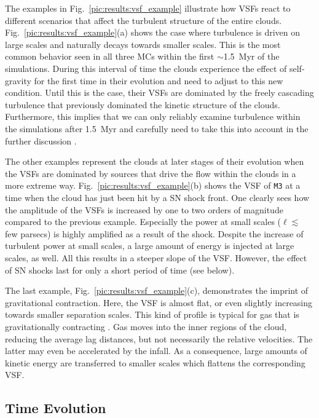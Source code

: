 \documentclass{aa}		%
\begin{document}
The examples in Fig.~\ref{pic:results:vsf_example} illustrate how VSFs react to different scenarios that affect the turbulent structure of the entire clouds. 
Fig.~\ref{pic:results:vsf_example}(a) shows the case where turbulence is driven on large scales and naturally decays towards smaller scales.
This is the most common behavior seen in all three MCs within the first $\sim$1.5~Myr of the simulations.
During this interval of time the clouds experience the effect of self-gravity for the first time in their evolution and need to adjust to this new condition.
Until this is the case, their VSFs are dominated by the freely cascading turbulence that previously dominated the kinetic structure of the clouds.
Furthermore, this implies that we can only reliably examine turbulence within the simulations after 1.5~Myr and carefully need to take this into account in the further discussion \citep[see][]{IbanezMejia2017,Seifried2017b}.

The other examples represent the clouds at later stages of their evolution when the VSFs are dominated by sources that drive the flow within the clouds in a more extreme way.
Fig.~\ref{pic:results:vsf_example}(b) shows the VSF of \texttt{M3} at a time when the cloud has just been hit by a SN shock front. 
One clearly sees how the amplitude of the VSFs is increased by one to two orders of magnitude compared to the previous example.
Especially the power at small scales ($\ell \lesssim$ few parsecs) is highly amplified as a result of the shock.
Despite the increase of turbulent power at small scales, a large amount of energy is injected at large scales, as well.
All this results in a steeper slope of the VSF.
However, the effect of SN shocks last for only a short period of time (see below).

The last example, Fig.~\ref{pic:results:vsf_example}(c), demonstrates the imprint of gravitational contraction.
Here, the VSF is almost flat, or even slightly increasing towards smaller separation scales. 
This kind of profile is typical for gas that is gravitationally contracting \citep{Boneberg2015,Burkhart2015}.
Gas moves into the inner regions of the cloud, reducing the average lag distances, but not necessarily the relative velocities.
The latter may even be accelerated by the infall.
As a consequence, large amounts of kinetic energy are transferred to smaller scales which flattens the corresponding VSF.

\subsection{Time Evolution}\label{results:normal}
\end{document}
